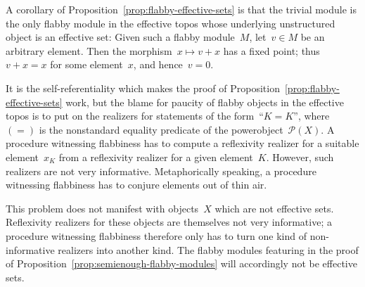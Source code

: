 \documentclass[oneside]{amsart}
\theoremstyle{definition}
\theoremstyle{plain}
\theoremstyle{remark}
\renewcommand{\P}{\mathcal{P}}
\renewcommand{\_}{\mathpunct{.}\,}
\newcommand{\effective}{ef{}fective\xspace}
\begin{document}
A corollary of Proposition~\ref{prop:flabby-effective-sets} is that the trivial
module is the only flabby module in the \effective topos whose underlying
unstructured object is an \effective set: Given such a flabby module~$M$, let~$v
\in M$ be an arbitrary element. Then the morphism~$x \mapsto v + x$ has a fixed
point; thus~$v + x = x$ for some element~$x$, and hence~$v = 0$.

It is the self-referentiality which makes the proof of
Proposition~\ref{prop:flabby-effective-sets} work, but the blame for paucity
of flabby objects in the \effective topos is to put on the realizers for
statements of the form~``$K = K$'', where~$({=})$ is the nonstandard equality
predicate of the powerobject~$\P(X)$. A procedure witnessing flabbiness has to
compute a reflexivity realizer for a suitable element~$x_K$ from a reflexivity
realizer for a given element~$K$. However, such realizers are not very
informative. Metaphorically speaking, a procedure witnessing flabbiness has to
conjure elements out of thin air.

This problem does not manifest with objects~$X$ which are not \effective sets.
Reflexivity realizers for these objects are themselves not very informative;
a procedure witnessing flabbiness therefore only has to turn one kind of
non-informative realizers into another kind. The flabby modules featuring in
the proof of Proposition~\ref{prop:semienough-flabby-modules} will accordingly
not be \effective sets.
\end{document}
